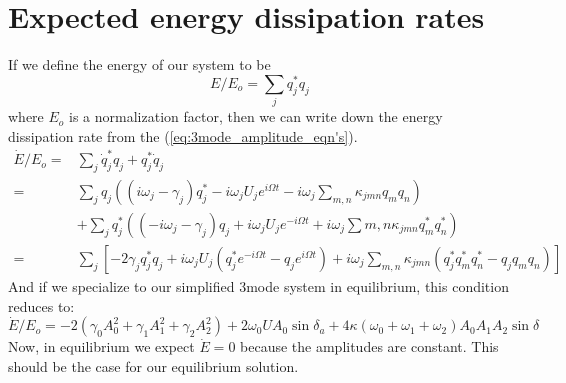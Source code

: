 \section*{Expected energy dissipation rates}

If we define the energy of our system to be
\begin{equation}
E/E_o = \sum_j q_j^\ast q_j
\end{equation}
where $E_o$ is a normalization factor, then we can write down the energy dissipation rate from the (\ref{eq:3mode_amplitude_eqn's}).
\begin{subequations}
\begin{align}
\dot{E}/E_o  = & \sum_j \dot{q}_j^\ast q_j + q_j^\ast \dot{q}_j \\
             = & \sum_j q_j \left( (i\omega_j - \gamma_j)q_j^\ast - i\omega_j U_j e^{i\Omega t} -i\omega_j\sum_{m,n}\kappa_{jmn}q_m q_n \right) \\ 
               & + \sum_j q_j^\ast \left( (-i\omega_j -\gamma_j)q_j + i\omega_j U_j e^{-i\Omega t} + i\omega_j\sum{m,n}\kappa_{jmn}q_m^\ast q_n^\ast \right) \\
             = & \sum_j\left[ -2\gamma_j q_j^\ast q_j + i\omega_j U_j \left( q_j^\ast e^{-i\Omega t} - q_j e^{i\Omega t} \right) + i\omega_j \sum_{m,n} \kappa_{jmn}\left(q_j^\ast q_m^\ast q_n^\ast - q_j q_m q_n\right)\right]
\end{align}
\end{subequations}
And if we specialize to our simplified 3mode system in equilibrium, this condition reduces to:
\begin{equation}
\dot{E}/E_o = -2\left(\gamma_0 A_0^2 + \gamma_1 A_1^2 + \gamma_2 A_2^2\right) + 2\omega_0 U A_0 \sin\delta_a + 4\kappa\left(\omega_0 + \omega_1 + \omega_2\right) A_0 A_1 A_2\sin\delta
\end{equation}
Now, in equilibrium we expect $\dot{E} = 0$ because the amplitudes are constant. This should be the case for our equilibrium solution.

